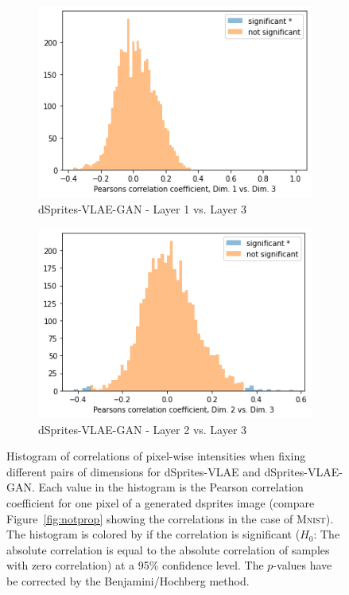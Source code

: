 \begin{figure}
\begin{subfigure}{.3\textwidth}
        \includegraphics[width=\textwidth]{images/notprop/dsprites/vlae_gan/dim_1_3.png}
        \caption{dSprites-VLAE-GAN - Layer 1 vs. Layer 3}
    \end{subfigure}
    \hfill
    \begin{subfigure}{.3\textwidth}
        \includegraphics[width=\textwidth]{images/notprop/dsprites/vlae_gan/dim_2_3.png}
        \caption{dSprites-VLAE-GAN - Layer 2 vs. Layer 3}
    \end{subfigure}
    \caption[dSprites-VLAE and dSprites-VLAE-GAN - Pixel intensity correlation]{Histogram of correlations of pixel-wise intensities when fixing different pairs of dimensions for dSprites-VLAE and dSprites-VLAE-GAN.
    Each value in the histogram is the Pearson correlation coefficient for one pixel of a generated dsprites image (compare Figure~\ref{fig:notprop} showing the correlations in the case of \textsc{Mnist}).
    The histogram is colored by if the correlation is significant ($H_0$: The absolute correlation is equal to the absolute correlation of samples with zero correlation) at a 95\% confidence level.
    The $p$-values have be corrected by the Benjamini/Hochberg method.}
    \label{fig:dsprites_vlae_notprop}
\end{figure}

